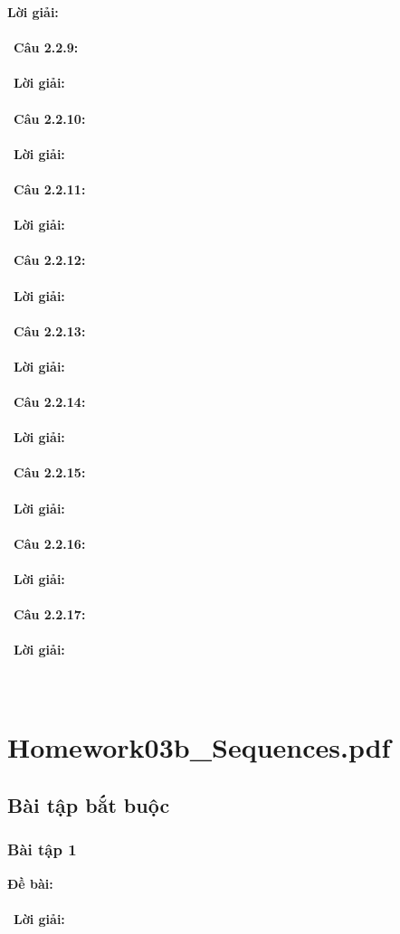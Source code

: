 \documentclass[a4paper]{article}
\begin{document}
\textbf{Lời giải:} \\\ \\\
\textbf{Câu 2.2.9: } \\\ \\\
\textbf{Lời giải:} \\\ \\\
\textbf{Câu 2.2.10: } \\\ \\\
\textbf{Lời giải:} \\\ \\\
\textbf{Câu 2.2.11: } \\\ \\\
\textbf{Lời giải:} \\\ \\\
\textbf{Câu 2.2.12: } \\\ \\\
\textbf{Lời giải:} \\\ \\\
\textbf{Câu 2.2.13: } \\\ \\\
\textbf{Lời giải:} \\\ \\\
\textbf{Câu 2.2.14: } \\\ \\\
\textbf{Lời giải:} \\\ \\\
\textbf{Câu 2.2.15: } \\\ \\\
\textbf{Lời giải:} \\\ \\\
\textbf{Câu 2.2.16: } \\\ \\\
\textbf{Lời giải:} \\\ \\\
\textbf{Câu 2.2.17: } \\\ \\\
\textbf{Lời giải:} \\\ \\\
\clearpage

\section{Homework03b\_Sequences.pdf}
\subsection{Bài tập bắt buộc}
\subsubsection{Bài tập 1}
\textbf{Đề bài:} 
\\\ \\\
\textbf{Lời giải:} \\\ \\\
\clearpage
\end{document}
